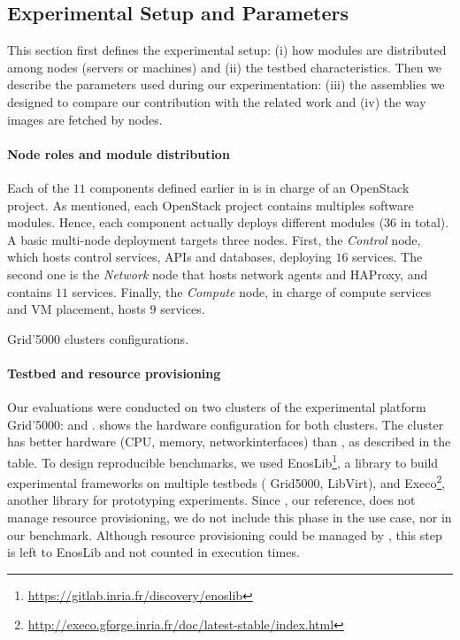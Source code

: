 \subsection{Experimental Setup and Parameters}

This section first defines the experimental setup: (i) how modules are
distributed among nodes (\ie servers or machines) and (ii) the testbed
characteristics. Then we describe the parameters used during
our experimentation: (iii) the assemblies we designed to compare our
contribution with the related work and (iv) the way \docker images are
fetched by nodes.

\paragraph{Node roles and module distribution}
Each of the $11$ components defined earlier in \kolla is in charge of
an OpenStack project. As mentioned, each OpenStack project
contains multiples software modules. Hence, each component actually
deploys different modules ($36$ in total). A basic multi-node \kolla
deployment targets three nodes. First, the \emph{Control} node, which
hosts control services, APIs and databases, deploying $16$
services. The second one is the \emph{Network} node that hosts network
agents and HAProxy, and contains $11$ services. Finally, the
\emph{Compute} node, in charge of compute services and VM placement,
hosts $9$ services.

\begin{table}
  \begin{center}
    \small
    
    \caption{Grid'5000 clusters configurations.}
    \label{tab:g5k}
  \end{center}
\end{table}

\paragraph{Testbed and resource provisioning}
Our evaluations were conducted on two clusters of the
experimental platform Grid'5000: \ecotype and \nova. 
shows the hardware configuration for both clusters. The cluster
\ecotype has better hardware (CPU, memory, networkinterfaces) than \nova,
as described in the table. To design reproducible benchmarks, we used
EnosLib\footnote{\url{https://gitlab.inria.fr/discovery/enoslib}}, a
library to build experimental frameworks on multiple testbeds (\eg
Grid5000, LibVirt), and
Execo\footnote{\url{http://execo.gforge.inria.fr/doc/latest-stable/index.html}},
another library for prototyping experiments. Since \kolla, our
reference, does not manage resource provisioning, we do not include
this phase in the use case, nor in our benchmark. Although resource
provisioning could be managed by \mad, this step is left to EnosLib
and not counted in execution times.

